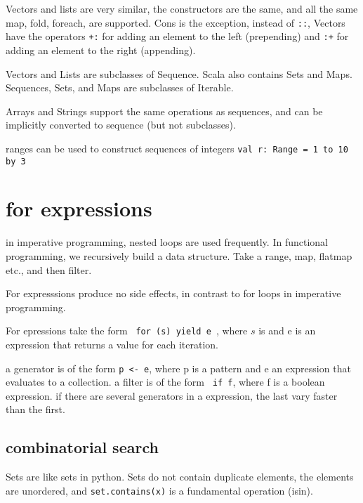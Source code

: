 Vectors and lists are very similar, the constructors are the same, and all the same map, fold, foreach, are supported. Cons is the exception, instead of \lstinline|::|, Vectors have the operators \lstinline|+:| for adding an element to the left (prepending) and \lstinline|:+| for adding an element to the right (appending).

Vectors and Lists are subclasses of Sequence. Scala also contains Sets and Maps. Sequences, Sets, and Maps are subclasses of Iterable.

Arrays and Strings support the same operations as sequences, and can be implicitly converted to sequence (but not subclasses).

ranges can be used to construct sequences of integers
\lstinline|val r: Range = 1 to 10 by 3|

\section{for expressions}

in imperative programming, nested loops are used frequently. In functional programming, we recursively build a data structure. Take a range, map, flatmap etc., and then filter.

For expresssions produce no side effects, in contrast to for loops in imperative programming.

For epressions take the form \lstinline| for (s) yield e |, where $s$ is  and e is an expression that returns a value for each iteration.

a generator is of the form \lstinline|p <- e|, where p is a pattern and e an expression that evaluates to a collection. a filter is of the form \lstinline| if f|, where f is a boolean expression. if there are several generators in a expression, the last vary faster than the first.

\subsection{combinatorial search}

Sets are like sets in python. Sets do not contain duplicate elements, the elements are unordered, and \lstinline|set.contains(x)| is a fundamental operation (isin).










